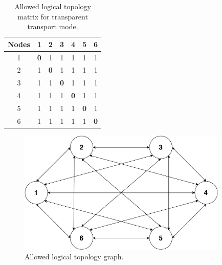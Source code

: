 \begin{table}[H]
	\centering	
	\begin{tabular}{|c|c|c|c|c|c|c|}
		\hline
		\multicolumn{1}{|l|}{\textbf{Nodes}} & 1   & 2   & 3   & 4   & 5   & 6  \\ \hline
		1                           & \textbf{0}   & 1 & 1 & 1 & 1 & 1 \\ \hline
		2                           & 1 & \textbf{0}   & 1 & 1 & 1 & 1 \\ \hline
		3                           & 1 & 1 & \textbf{0}   & 1 & 1 & 1 \\ \hline
		4                           & 1 & 1 & 1 & \textbf{0}   & 1 & 1 \\ \hline
		5                           & 1 & 1 & 1 & 1 & \textbf{0}   & 1 \\ \hline
		6                           & 1 & 1 & 1 & 1 & 1 & \textbf{0}   \\ \hline
	\end{tabular}
	\caption{Allowed logical topology matrix for transparent transport mode.}
	\label{Transparentlogical_topology}
\end{table}
\begin{figure}[H]
	\centering
	\includegraphics[width=10cm]{sdf/heuristic/transparent/figures/logicalTopology}
	\caption{Allowed logical topology graph.}
	\label{allowed_optical_surv_transparent2}
\end{figure}


